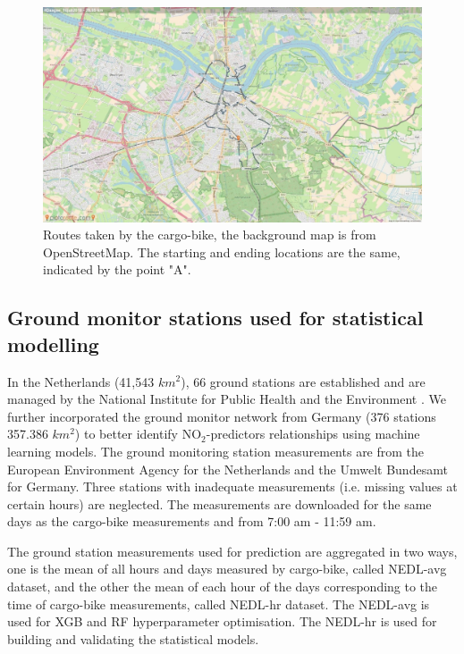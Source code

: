 \documentclass{article}
\begin{document}
\begin{figure}
    \includegraphics[width=\linewidth,trim=4cm 1cm 4cm 1cm, clip=true]{f1b.jpg}
    
    \caption {Routes taken by the cargo-bike, the background map is from OpenStreetMap\citep{openstreetmap}. The starting and ending locations are the same, indicated by the point "A". }
    \label{route}
\end{figure}

\subsection{Ground monitor stations used for statistical modelling}

In the Netherlands (41,543 $km^2$), 66 ground stations are established and are managed by the National Institute for Public Health and the Environment \citep[RIVM,][]{RIVMLML}. We further incorporated the ground monitor network from Germany (376 stations 357.386 $km^2$) to better identify NO$_2$-predictors relationships using machine learning models. The ground monitoring station measurements are from the European Environment Agency \citep{EEA} for the Netherlands and the Umwelt Bundesamt \citep{germansource} for Germany. Three stations with inadequate measurements (i.e. missing values at certain hours) are neglected. The measurements are downloaded for the same days as the cargo-bike measurements and from 7:00 am - 11:59 am.  

The ground station measurements used for prediction are aggregated in two ways, one is the mean of all hours and days measured by cargo-bike, called NEDL-avg dataset, and the other the mean of each hour of the days corresponding to the time of cargo-bike measurements, called NEDL-hr dataset. The NEDL-avg is used for XGB and RF hyperparameter optimisation. The NEDL-hr is used for building and validating the statistical models.
\end{document}
